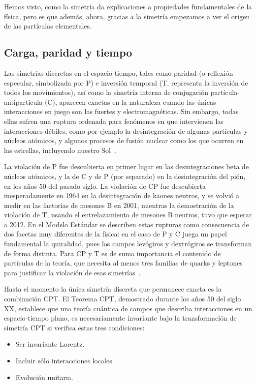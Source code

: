 Hemos visto, como la simetría da explicaciones a propiedades fundamentales de la física, pero es que además, ahora, gracias a la simetría empezamos a ver el origen de las partículas elementales.

\subsection{Carga, paridad y tiempo}\label{subsec:paridad-carga-y-tiempo}
Las simetrías discretas en el espacio-tiempo, tales como paridad (o reflexión especular, simbolizada por P) e inversión temporal (T, representa la inversión de todos los movimientos), así como la simetría interna de conjugación partícula-antipartícula (C), aparecen exactas en la naturaleza cuando las únicas interacciones en juego son las fuertes y electromagnéticas. Sin embargo, todas ellas sufren una ruptura ordenada para fenómenos en que intervienen las interacciones débiles, como por ejemplo la desintegración de algunas partículas y núcleos atómicos, y algunos procesos de fusión nuclear como los que ocurren en las estrellas, incluyendo nuestro Sol~\autocite{IFIC}.

La violación de P fue descubierta en primer lugar en las desintegraciones beta de núcleos atómicos, y la de C y de P (por separado) en la desintegración del pión, en los años 50 del pasado siglo. La violación de CP fue descubierta inesperadamente en 1964 en la desintegración de kaones neutros, y se volvió a medir en las factorías de mesones B en 2001, mientras la demostración de la violación de T, usando el entrelazamiento de mesones B neutros, tuvo que esperar a 2012. En el Modelo Estándar se describen estas rupturas como consecuencia de dos facetas muy diferentes de la física: en el caso de P y C juega un papel fundamental la quiralidad, pues los campos levógiros y dextrógiros se transforman de forma distinta. Para CP y T es de suma importancia el contenido de partículas de la teoría, que necesita al menos tres familias de quarks y leptones para justificar la violación de esas simetrías~\autocite{IFIC}.

Hasta el momento la única simetría discreta que permanece exacta es la combinación CPT. El Teorema CPT, demostrado durante los años 50 del siglo XX, establece que una teoría cuántica de campos que describa interacciones en un espacio-tiempo plano, es necesariamente invariante bajo la transformación de simetría CPT si verifica estas tres condiciones:
\begin{itemize}
	\item Ser invariante Lorentz.
	\item Incluir sólo interacciones locales.
	\item Evolución unitaria.
\end{itemize}
~\autocite{IFIC}

